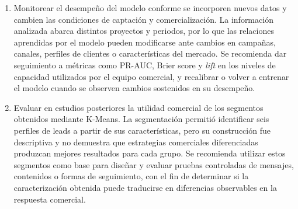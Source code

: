 \begin{enumerate}
    \item Monitorear el desempeño del modelo conforme se incorporen nuevos datos y cambien las condiciones de captación y comercialización. La información analizada abarca distintos proyectos y periodos, por lo que las relaciones aprendidas por el modelo pueden modificarse ante cambios en campañas, canales, perfiles de clientes o características del mercado. Se recomienda dar seguimiento a métricas como PR-AUC, Brier score y \textit{lift} en los niveles de capacidad utilizados por el equipo comercial, y recalibrar o volver a entrenar el modelo cuando se observen cambios sostenidos en su desempeño.

    \item Evaluar en estudios posteriores la utilidad comercial de los segmentos obtenidos mediante K-Means. La segmentación permitió identificar seis perfiles de leads a partir de sus características, pero su construcción fue descriptiva y no demuestra que estrategias comerciales diferenciadas produzcan mejores resultados para cada grupo. Se recomienda utilizar estos segmentos como base para diseñar y evaluar pruebas controladas de mensajes, contenidos o formas de seguimiento, con el fin de determinar si la caracterización obtenida puede traducirse en diferencias observables en la respuesta comercial.

\end{enumerate}